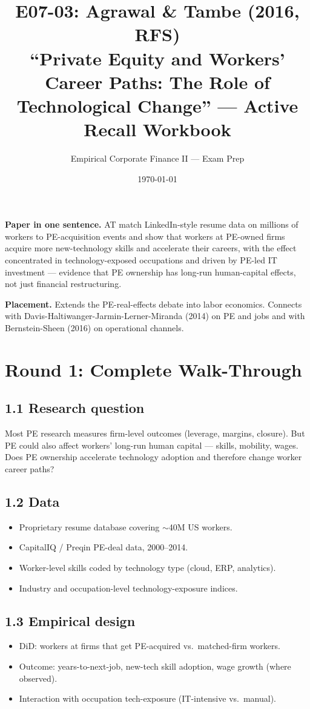 \documentclass[11pt]{article}
\title{E07-03: Agrawal \& Tambe (2016, RFS) \\
\large ``Private Equity and Workers' Career Paths: The Role of Technological Change'' --- Active Recall Workbook}
\author{Empirical Corporate Finance II --- Exam Prep}
\date{\today}
\begin{document}
\maketitle

\begin{keybox}
\textbf{Paper in one sentence.} AT match LinkedIn-style resume data on millions of workers to PE-acquisition events and show that workers at PE-owned firms acquire more new-technology skills and accelerate their careers, with the effect concentrated in technology-exposed occupations and driven by PE-led IT investment --- evidence that PE ownership has long-run human-capital effects, not just financial restructuring.

\textbf{Placement.} Extends the PE-real-effects debate into labor economics. Connects with Davis-Haltiwanger-Jarmin-Lerner-Miranda (2014) on PE and jobs and with Bernstein-Sheen (2016) on operational channels.
\end{keybox}

\section*{Round 1: Complete Walk-Through}

\subsection*{1.1 Research question}
Most PE research measures firm-level outcomes (leverage, margins, closure). But PE could also affect workers' long-run human capital --- skills, mobility, wages. Does PE ownership accelerate technology adoption and therefore change worker career paths?

\subsection*{1.2 Data}
\begin{itemize}
\item Proprietary resume database covering $\sim$40M US workers.
\item CapitalIQ / Preqin PE-deal data, 2000--2014.
\item Worker-level skills coded by technology type (cloud, ERP, analytics).
\item Industry and occupation-level technology-exposure indices.
\end{itemize}

\subsection*{1.3 Empirical design}
\begin{itemize}
\item DiD: workers at firms that get PE-acquired vs.\ matched-firm workers.
\item Outcome: years-to-next-job, new-tech skill adoption, wage growth (where observed).
\item Interaction with occupation tech-exposure (IT-intensive vs.\ manual).
\end{itemize}
\end{document}
